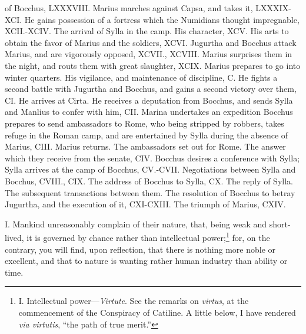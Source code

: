 of Bocchus, LXXXVIII. Marius marches against Capsa, and takes it,
LXXXIX-XCI. He gains possession of a fortress which the Numidians thought
impregnable, XCII.-XCIV. The arrival of Sylla in the camp. His character,
XCV. His arts to obtain the favor of Marius and the soldiers, XCVI.
Jugurtha and Bocchus attack Marius, and are vigorously opposed, XCVII.,
XCVIII. Marius surprises them in the night, and routs them with great
slaughter, XCIX. Marius prepares to go into winter quarters. His
vigilance, and maintenance of discipline, C. He fights a second battle
with Jugurtha and Bocchus, and gains a second victory over them, CI. He
arrives at Cirta. He receives a deputation from Bocchus, and sends Sylla
and Manlius to confer with him, CII. Marina undertakes an expedition
Bocchus prepares to send ambassadors to Rome, who being stripped by
robbers, takes refuge in the Roman camp, and are entertained by Sylla
during the absence of Marius, CIII. Marius returns. The ambassadors
set out for Rome. The answer which they receive from the senate, CIV.
Bocchus desires a conference with Sylla; Sylla arrives at the camp of
Bocchus, CV.-CVII. Negotiations between Sylla and Bocchus, CVIII.,
CIX. The address of Bocchus to Sylla, CX. The reply of Sylla. The
subsequent transactions between them. The resolution of Bocchus to
betray Jugurtha, and the execution of it, CXI-CXIII. The triumph of
Marius, CXIV.

I. Mankind unreasonably complain of their nature, that, being weak and
short-lived, it is governed by chance rather than intellectual power;\footnote{I. Intellectual power—\emph{Virtute}. See the remarks on
\emph{virtus}, at the commencement of the Conspiracy of Catiline. A little
below, I have rendered \emph{via virtutis}, ``the path of true merit.''}
for, on the contrary, you will find, upon reflection, that there is
nothing more noble or excellent, and that to nature is wanting rather
human industry than ability or time.

